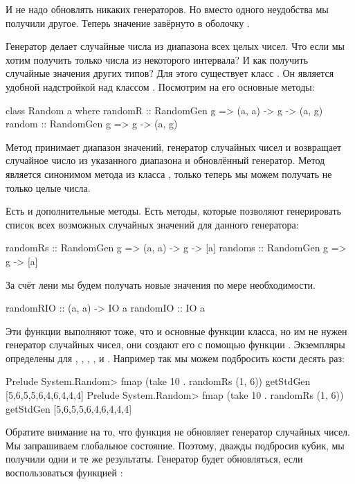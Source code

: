 И не надо обновлять никаких генераторов. Но вместо одного
неудобства мы получили другое. Теперь значение завёрнуто в оболочку .

Генератор  делает случайные числа из
диапазона всех целых чисел. Что если мы хотим получить 
только числа из некоторого интервала? И как получить 
случайные значения других типов?
Для этого существует класс . Он является
удобной надстройкой над классом .
Посмотрим на его основные методы:

\begin{code}
class Random a where
    randomR :: RandomGen g => (a, a) -> g -> (a, g)
    random  :: RandomGen g => g -> (a, g)
\end{code}

Метод  принимает диапазон значений, генератор
случайных чисел и возвращает случайное число из указанного
диапазона и обновлённый генератор. Метод  
является синонимом метода  из класса ,
только теперь мы можем получать не только целые числа.

Есть и дополнительные методы. Есть методы, которые позволяют
генерировать список всех возможных случайных значений
для данного генератора:

\begin{code}
    randomRs :: RandomGen g => (a, a) -> g -> [a]
    randoms  :: RandomGen g => g -> [a]
\end{code}

За счёт лени мы будем получать новые значения по 
мере необходимости. 

\begin{code}
    randomRIO   :: (a, a) -> IO a
    randomIO    :: IO a
\end{code}

Эти функции выполняют тоже, что и основные функции
класса, но им не нужен генератор случайных чисел, они
создают его с помощью функции .
Экземпляры  определены для 
, , , , 	и
. Например так мы можем подбросить кости
десять раз:

\begin{code}
Prelude System.Random> fmap (take 10 . randomRs (1, 6)) getStdGen
[5,6,5,5,6,4,6,4,4,4]
Prelude System.Random> fmap (take 10 . randomRs (1, 6)) getStdGen
[5,6,5,5,6,4,6,4,4,4]
\end{code}

Обратите внимание на то, что функция  не
обновляет генератор случайных чисел. Мы запрашиваем 
глобальное состояние. Поэтому, дважды подбросив кубик,
мы получили одни и те же результаты. Генератор 
будет обновляться, если воспользоваться функцией
:

